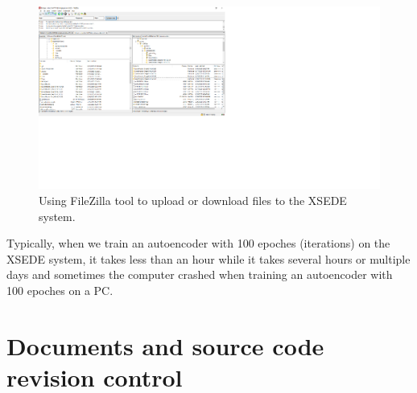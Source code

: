 \documentclass{article}
\begin{document}
\begin{figure}[h!]
	\centering
	\includegraphics[width=1\textwidth]{FileZilla.png}
	\caption{Using FileZilla tool to upload or download files to the XSEDE system.}
	\label{fig:FileZilla}
\end{figure}
Typically, when we train an autoencoder with 100 epoches (iterations) on the XSEDE system, it takes less than an hour while it takes several hours or multiple days and sometimes the computer crashed when training an autoencoder with 100 epoches on a PC.
\section{Documents and source code revision control}
\end{document}
